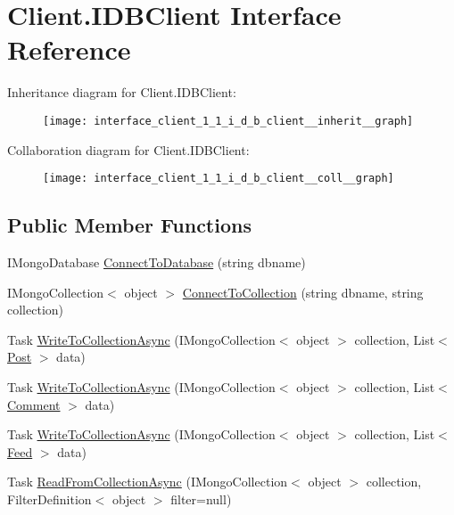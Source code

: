 \hypertarget{interface_client_1_1_i_d_b_client}{}\section{Client.\+I\+D\+B\+Client Interface Reference}
\label{interface_client_1_1_i_d_b_client}


Inheritance diagram for Client.\+I\+D\+B\+Client\+:
\nopagebreak
\begin{figure}[H]
\begin{center}
\leavevmode
\texttt{[image: interface\_client\_1\_1\_i\_d\_b\_client\_\_inherit\_\_graph]}
\end{center}
\end{figure}


Collaboration diagram for Client.\+I\+D\+B\+Client\+:
\nopagebreak
\begin{figure}[H]
\begin{center}
\leavevmode
\texttt{[image: interface\_client\_1\_1\_i\_d\_b\_client\_\_coll\_\_graph]}
\end{center}
\end{figure}
\subsection*{Public Member Functions}
\begin{DoxyCompactItemize}
\item 
I\+Mongo\+Database \hyperlink{interface_client_1_1_i_d_b_client_a793702523aa275ef01d40f78a96eff01}{Connect\+To\+Database} (string dbname)
\item 
I\+Mongo\+Collection$<$ object $>$ \hyperlink{interface_client_1_1_i_d_b_client_a560e1589d25b74448622fcf04949082e}{Connect\+To\+Collection} (string dbname, string collection)
\item 
Task \hyperlink{interface_client_1_1_i_d_b_client_a9fbee0bdce4ec3fc4eb388ba637a855a}{Write\+To\+Collection\+Async} (I\+Mongo\+Collection$<$ object $>$ collection, List$<$ \hyperlink{class_data_1_1_facebook_objects_1_1_post}{Post} $>$ data)
\item 
Task \hyperlink{interface_client_1_1_i_d_b_client_af2827db82923cb16cd0295ba89105984}{Write\+To\+Collection\+Async} (I\+Mongo\+Collection$<$ object $>$ collection, List$<$ \hyperlink{class_data_1_1_facebook_objects_1_1_comment}{Comment} $>$ data)
\item 
Task \hyperlink{interface_client_1_1_i_d_b_client_ac53ec8495ee3d6afb28196cb9983d2ac}{Write\+To\+Collection\+Async} (I\+Mongo\+Collection$<$ object $>$ collection, List$<$ \hyperlink{class_data_1_1_facebook_objects_1_1_feed}{Feed} $>$ data)
\item 
Task \hyperlink{interface_client_1_1_i_d_b_client_ae34d7b6d2b6c624f2dcf537b95aafad1}{Read\+From\+Collection\+Async} (I\+Mongo\+Collection$<$ object $>$ collection, Filter\+Definition$<$ object $>$ filter=null)
\end{DoxyCompactItemize}


